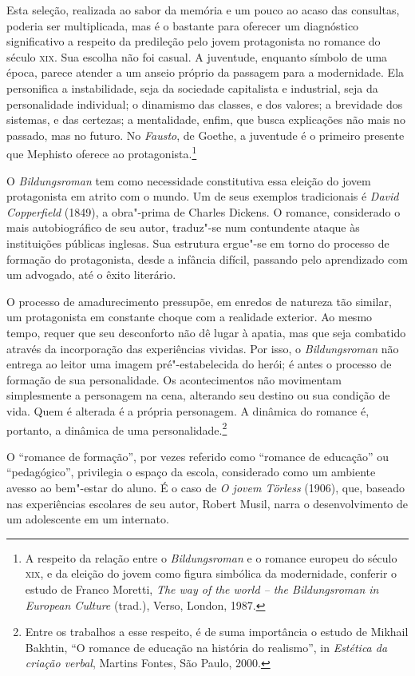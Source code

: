 Esta seleção, realizada ao sabor da memória e um pouco
ao acaso das consultas, poderia ser multiplicada, mas é o bastante para
oferecer um diagnóstico significativo a respeito da predileção pelo
jovem protagonista no romance do século \textsc{xix}. Sua escolha não foi
casual. A juventude, enquanto símbolo de uma época, parece atender a um
anseio próprio da passagem para a modernidade. Ela personifica a
instabilidade, seja da sociedade capitalista e industrial, seja da
personalidade individual; o dinamismo das classes, e dos valores; a
brevidade dos sistemas, e das certezas; a mentalidade, enfim, que busca
explicações não mais no passado, mas no futuro. No
\textit{Fausto}, de Goethe, a juventude é o
primeiro presente que Mephisto oferece ao protagonista.\footnote{ A
respeito da relação entre o \textit{Bildungsroman} e o romance europeu
do século \textsc{xix}, e da eleição do jovem como figura simbólica da
modernidade, conferir o estudo de Franco Moretti, \textit{The way of
the world -- the Bildungsroman in European Culture} (trad.), Verso,
London, 1987.} 

O \textit{Bildungsroman} tem
como necessidade constitutiva essa eleição do jovem protagonista em
atrito com o mundo. Um de seus exemplos tradicionais é
\textit{David Copperfield} (1849), a obra"-prima de Charles Dickens. 
O romance, considerado o mais
autobiográfico de seu autor, traduz"-se num contundente ataque às
instituições públicas inglesas. Sua estrutura ergue"-se em torno do
processo de formação do protagonista, desde a infância difícil,
passando pelo aprendizado com um advogado, até o êxito literário. 


O processo de amadurecimento pressupõe, em enredos de
natureza tão similar, um protagonista em constante choque com a
realidade exterior. Ao mesmo tempo, requer que seu desconforto não dê
lugar à apatia, mas que seja combatido através da incorporação das
experiências vividas. Por isso, o
\textit{Bildungsroman} não entrega ao leitor
uma imagem pré"-estabelecida do herói; é antes o processo de formação
de sua personalidade. Os acontecimentos não movimentam simplesmente a
personagem na cena, alterando seu destino ou sua condição de vida. Quem
é alterada é a própria personagem. A dinâmica do romance é, portanto, a
dinâmica de uma personalidade.\footnote{Entre os trabalhos a esse respeito, 
é de suma importância o estudo de Mikhail Bakhtin, ``O romance de educação na história do
realismo'', in \textit{Estética da criação verbal}, Martins Fontes, São Paulo, 2000.} 

O ``romance de formação'', por vezes referido como
``romance de educação'' ou ``pedagógico'', privilegia o espaço da escola,
considerado como um ambiente avesso ao bem"-estar do aluno. É o caso
de \textit{O jovem Törless} (1906), que,
baseado nas experiências escolares de seu autor, Robert Musil, narra o
desenvolvimento de um adolescente em um internato.

